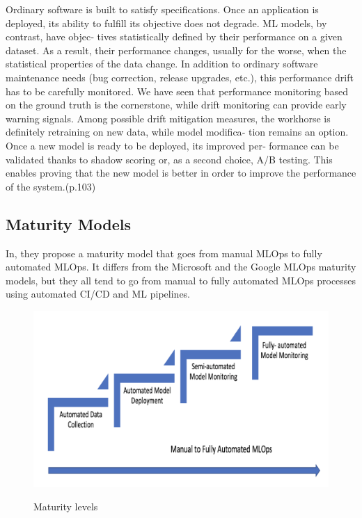 Ordinary software is built to satisfy specifications. Once an application is deployed,
its ability to fulfill its objective does not degrade. ML models, by contrast, have objec‐
tives statistically defined by their performance on a given dataset. As a result, their
performance changes, usually for the worse, when the statistical properties of the data
change.
In addition to ordinary software maintenance needs (bug correction, release
upgrades, etc.), this performance drift has to be carefully monitored. We have seen
that performance monitoring based on the ground truth is the cornerstone, while
drift monitoring can provide early warning signals. Among possible drift mitigation
measures, the workhorse is definitely retraining on new data, while model modifica‐
tion remains an option. Once a new model is ready to be deployed, its improved per‐
formance can be validated thanks to shadow scoring or, as a second choice, A/B
testing. This enables proving that the new model is better in order to improve the
performance of the system.\cite{treveil2020introducing}(p.103)


\subsection{Maturity Models}\label{subsec:matutiry-models}
In\cite{mlops-maturity-model}, they propose a maturity model that goes from manual MLOps to fully automated MLOps.
It differs from the Microsoft and the Google MLOps maturity models,
but they all tend to go from manual to fully automated MLOps processes using automated CI/CD and
ML pipelines.\cite{mlops-definition-tools-and-challenge}

\begin{figure}[!htbp]
    \caption{Maturity levels \cite{mlops-maturity-model}}
    \centering
    \includegraphics[scale=0.5]{images/maturity-levels}
    \label{fig:maturity}
\end{figure}

